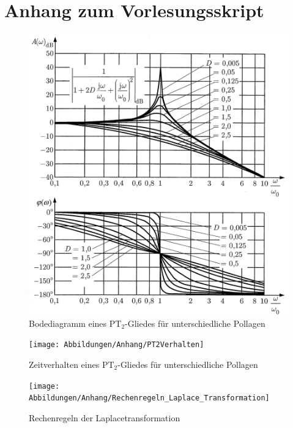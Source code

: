 \chapter{Anhang zum Vorlesungsskript}
%
\begin{figure}
	\centering
	\includegraphics[width=0.9\linewidth]{Abbildungen/Anhang/FrequenzkennliniePT2}
	\caption{Bodediagramm eines PT$_{2}$-Gliedes für unterschiedliche Pollagen \cite{Unbehauen08}}
	\label{fig:pt2bode}
\end{figure}
%
\begin{figure}
	\centering
	\texttt{[image: Abbildungen/Anhang/PT2Verhalten]}
	\caption{Zeitverhalten eines PT$_{2}$-Gliedes für unterschiedliche Pollagen \cite{Unbehauen08}}
	\label{fig:pt2verhalten}
\end{figure}
%
\begin{figure}
	\centering
	\texttt{[image: Abbildungen/Anhang/Rechenregeln\_Laplace\_Transformation]}
	\caption{Rechenregeln der Laplacetransformation \cite{Winkler10}}
	\label{fig:LaplaceRegeln}
\end{figure}
%
